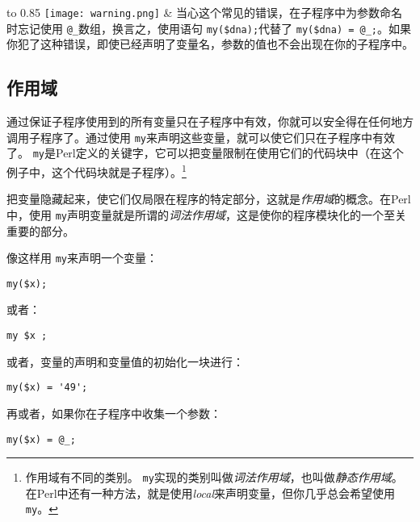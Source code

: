 \vspace{-5pt}
\begin{table}[h]
  \begin{center}
    \begin{tabu*} to 0.85\linewidth {|X[1,r,m]X[15,l,m]|}
      \tabucline{-}
      \texttt{[image: warning.png]} & 当心这个常见的错误，在子程序中为参数命名时忘记使用 \verb|@_|数组，换言之，使用语句 \verb|my($dna);|代替了 \verb|my($dna) = @_;|。如果你犯了这种错误，即使已经声明了变量名，参数的值也不会出现在你的子程序中。\\
      \tabucline{-}
    \end{tabu*}
  \end{center}
\end{table}
\vspace{-20pt}

\subsection{作用域}
通过保证子程序使用到的所有变量只在子程序中有效，你就可以安全得在任何地方调用子程序了。通过使用 \verb|my|来声明这些变量，就可以使它们只在子程序中有效了。 \verb|my|是Perl定义的关键字，它可以把变量限制在使用它们的代码块中（在这个例子中，这个代码块就是子程序）。\footnote{作用域有不同的类别。 \verb|my|实现的类别叫做\textit{词法作用域}，也叫做\textit{静态作用域}。在Perl中还有一种方法，就是使用\textit{local}来声明变量，但你几乎总会希望使用 \verb|my|。} 

把变量隐藏起来，使它们仅局限在程序的特定部分，这就是\textit{作用域}的概念。在Perl中，使用 \verb|my|声明变量就是所谓的\textit{词法作用域}，这是使你的程序模块化的一个至关重要的部分。

像这样用 \verb|my|来声明一个变量：

\begin{lstlisting}
my($x); 
\end{lstlisting}

或者：

\begin{lstlisting}
my $x ; 
\end{lstlisting}

或者，变量的声明和变量值的初始化一块进行：

\begin{lstlisting}
my($x) = '49'; 
\end{lstlisting}

再或者，如果你在子程序中收集一个参数：

\begin{lstlisting}
my($x) = @_; 
\end{lstlisting}

